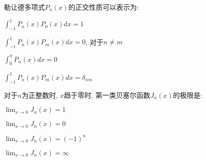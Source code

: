 \documentclass{njustexam}
\begin{document}
\begin{problem}
  勒让德多项式$P_n(x)$的正交性质可以表示为:
  \begin{abcd}
    \item $\int_{-1}^{1} P_n(x) P_0(x) dx = 1$

    \item $\int_{-1}^{1} P_n(x) P_m(x) dx = 0$, 对于$n \neq m$
    
    \item $\int_{0}^{\pi} P_n(x) dx = 0$
    
    \item $\int_{-1}^{1} P_n(x) P_m(x) dx = \delta_{nm}$
  \end{abcd}
\end{problem}




\begin{problem}
  对于$n$为正整数时, $x$趋于零时, 第一类贝塞尔函数$J_n(x)$的极限是:

  \begin{abcd}
\item $\lim_{x \to 0} J_n(x) = 1$

\item $\lim_{x \to 0} J_n(x) = 0$

\item $\lim_{x \to 0} J_n(x) = (-1)^n$

\item $\lim_{x \to 0} J_n(x) = \infty$
 \end{abcd}
\end{problem}
\end{document}
